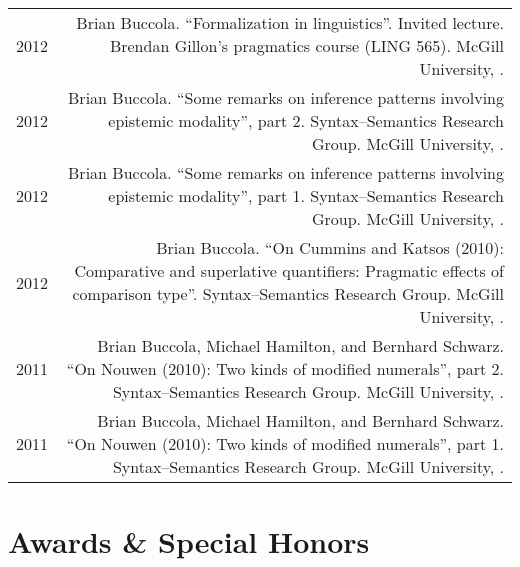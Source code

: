 \documentclass[letterpaper]{article}
\makeatletter
\newcommand{\name}{Brian Buccola}
\newcommand{\myvrule}{\color{lightgray}\vrule width 1.0pt}
\newenvironment{cvsection}{%
  \vspace{-3ex}
  \renewcommand{\arraystretch}{1.5}
  \begin{longtable}{@{} L R @{}}
}{%
  \end{longtable}
  \vspace{1ex}
  \renewcommand{\arraystretch}{1.0}
}
\makeatother
\begin{document}
\begin{cvsection}
  2012 & \name. ``Formalization in linguistics''.  Invited lecture. Brendan
  Gillon's pragmatics course (LING 565).  McGill University,
  . \\

  2012 & \name. ``Some remarks on inference patterns involving epistemic
  modality'', part 2. Syntax--Semantics Research Group.  McGill University,
  . \\

  2012 & \name. ``Some remarks on inference patterns involving epistemic
  modality'', part 1. Syntax--Semantics Research Group.  McGill University,
  . \\

  2012 & \name. ``On Cummins and Katsos (2010): Comparative and superlative
  quantifiers: Pragmatic effects of comparison type''.  Syntax--Semantics
  Research Group. McGill University, . \\

  2011 & \name, Michael Hamilton, and Bernhard Schwarz.  ``On Nouwen (2010):
  Two kinds of modified numerals'', part 2.  Syntax--Semantics Research Group.
  McGill University, . \\

  2011 & \name, Michael Hamilton, and Bernhard Schwarz.  ``On Nouwen (2010):
  Two kinds of modified numerals'', part 1.  Syntax--Semantics Research Group.
  McGill University, .
\end{cvsection}



\section*{Awards \& Special Honors}
\end{document}
